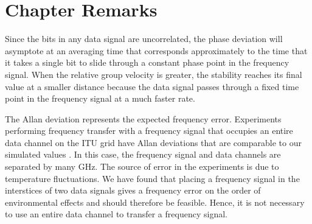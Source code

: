 \section{Chapter Remarks}

Since the bits in any data signal are uncorrelated, the phase deviation will asymptote at an averaging time that corresponds approximately to the time that it takes a single bit to slide through a constant phase point in the frequency signal. When the relative group velocity is greater, the stability reaches its final value at a smaller distance because the data signal passes through a fixed time point in the frequency signal at a much faster rate. 

The Allan deviation represents the expected frequency error. Experiments performing frequency transfer with a frequency signal that occupies an entire data channel on the ITU grid have Allan deviations that are comparable to our simulated values \cite{Serrano2013,cantin2017progress}. In this case, the frequency signal and data channels are separated by many GHz. The source of error in the experiments is due to temperature fluctuations. We have found that placing a frequency signal in the interstices of two data signals gives a frequency error on the order of environmental effects and should therefore be feasible. Hence, it is not necessary to use an entire data channel to transfer a frequency signal.